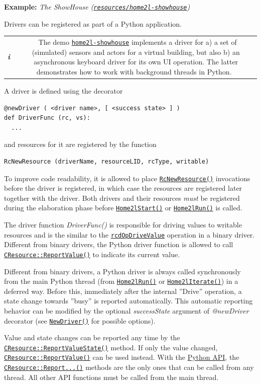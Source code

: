 \documentclass[12pt,english,parskip=half,headheight=19pt]{scrreprt}
\newcommand{\infobox}[1]{
  \par
  \medskip
  \hfill
  \setlength\arrayrulewidth{1pt}
  \begin{tabular}[t]{c|c|}
    \parbox{1.8em}{\hfill\textit{\Huge\textbf{i}\,}}
    &
    \,\parbox{0.89\linewidth}{\setlength{\parskip}{0.5em} \small #1}\,
  \end{tabular}
  \medskip
  \par
}
\newcommand{\idx}[1]{#1\index{#1}}
\newcommand{\reftool}[1]{\hyperref[tool:#1]{\texttt{\idx{#1}}}}
\newcommand{\refdoc}[2]{\href{#1}{#2}}              %
\newcommand{\refsrc}[1]{\href{#1}{\texttt{#1}}}     %
\newcommand{\refapic}[1]{\href{home2l-api_c/index.html}{\mbox{\texttt{#1}}}}            %
\newcommand{\refapipython}[1]{\href{home2l-api_python/index.html}{\mbox{\texttt{#1}}}}  %
\newcommand{\theapipython}{\refdoc{home2l-api_python/index.html}{Python API}}
\begin{document}
\textbf{Example:} \textit{The ShowHouse (\refsrc{resources/home2l-showhouse})}

Drivers can be registered as part of a Python application.

\infobox{
  The demo \reftool{home2l-showhouse} implements a driver for a) a set of (simulated)
  sensors and actors for a virtual building, but also
  b) an asynchronous keyboard driver for its own UI operation.
  The latter demonstrates how to work with background threads in Python.
}

A driver is defined using the decorator
\begin{lstlisting}
@newDriver ( <driver name>, [ <success state> ] )
def DriverFunc (rc, vs):
  ...
\end{lstlisting}

and resources for it are registered by the function
\begin{lstlisting}
RcNewResource (driverName, resourceLID, rcType, writable)
\end{lstlisting}

To improve code readability, it is allowed to place \refapipython{RcNewResource()} invocations before the driver is registered, in which case the resources are registered later together with the driver. Both drivers and their resources \textit{must} be registered during the elaboration phase before \refapipython{Home2lStart()} or \refapipython{Home2lRun()} is called.

The driver function \textit{DriverFunc()} is responsible for driving values to writable resources and is the similar to the
\refapic{rcdOpDriveValue} operation in a binary driver. Different from binary drivers, the Python driver function is allowed to call \refapic{CResource::ReportValue()} to indicate its current value.

Different from binary drivers, a Python driver is always called synchronously from the main Python thread (from \refapipython{Home2lRun()} or \refapipython{Home2lIterate()}) in a deferred way. Before this, immediately after the internal ''Drive'' operation, a state change towards ''busy'' is reported automatically. This automatic reporting behavior can be modified by the optional \textit{successState} argument of \textit{@newDriver} decorator (see \refapipython{NewDriver()} for possible options).

Value and state changes can be reported any time by the \refapic{CResource::ReportValueState()} method. 
If only the value changed, \refapic{CResource::ReportValue()} can be used instead. With the \theapipython{}, the \refapic{CResource::Report...()} methods are the only ones that can be called from any thread. All other API functions must be called from the main thread.
\end{document}
